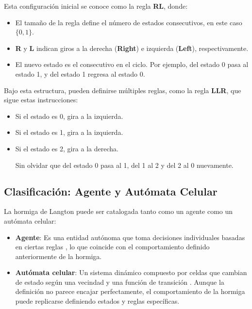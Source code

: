 \documentclass[12pt,twoside]{article}
\begin{document}
	Esta configuración inicial se conoce como la regla \textbf{RL}, donde:  
	\begin{itemize}
		\item El tamaño de la regla define el número de estados consecutivos, en este caso $\{0, 1\}$.  
		\item \textbf{R} y \textbf{L} indican giros a la derecha (\textbf{Right}) e izquierda (\textbf{Left}), respectivamente.  
		\item El nuevo estado es el consecutivo en el ciclo. Por ejemplo, del estado 0 pasa al estado 1, y del estado 1 regresa al estado 0.  
	\end{itemize}
	
	Bajo esta estructura, pueden definirse múltiples reglas, como la regla \textbf{LLR}, que sigue estas instrucciones:  
	\begin{itemize}[noitemsep]
		\item Si el estado es 0, gira a la izquierda.  
		\item Si el estado es 1, gira a la izquierda.  
		\item Si el estado es 2, gira a la derecha.  
	
	Sin olvidar que del estado 0 pasa al 1, del 1 al 2 y del 2 al 0 nuevamente.
	\end{itemize}
	
	\subsection{Clasificación: Agente y Autómata Celular}
	
	La hormiga de Langton puede ser catalogada tanto como un agente como un autómata celular:  
	\begin{itemize}
		\item \textbf{Agente}: Es una entidad autónoma que toma decisiones individuales basadas en ciertas reglas \cite{bib:lan3}, lo que coincide con el comportamiento definido anteriormente de la hormiga.  
		\item \textbf{Autómata celular}: Un sistema dinámico compuesto por celdas que cambian de estado según una vecindad y una función de transición \cite{bib:lan4}. Aunque la definición no parece encajar perfectamente, el comportamiento de la hormiga puede replicarse definiendo estados y reglas específicas.  
	\end{itemize}
	
\end{document}
